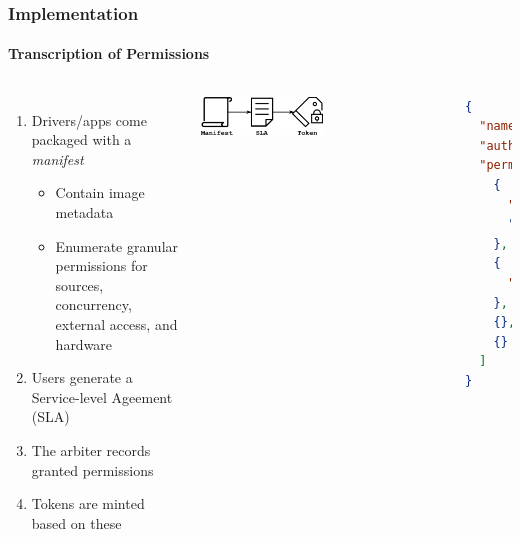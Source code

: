 \documentclass[aspectratio=169]{beamer}
\begin{document}
\begin{frame}[fragile]
	\frametitle{Implementation}
	\framesubtitle{Transcription of Permissions}
	\begin{columns}[c]
		\begin{enumerate}
			\item Drivers/apps come packaged with a \emph{manifest}
			\begin{itemize}
				\item Contain image metadata
				\item Enumerate granular permissions for sources, concurrency, external access, and hardware
			\end{itemize}
			\item Users generate a Service-level Ageement (SLA)
			\item The arbiter records granted permissions
			\item Tokens are minted based on these
		\end{enumerate}
		\centering
		\vspace{2em}
		\includegraphics[width=0.5\textwidth]{transcription}
		\centering
		\begin{lstlisting}[language=json]
{
  "name": "app",
  "author": "amar",
  "permissions": [
    {
      "source": "twitter"
      "required": true
    },
    {
      "source": "gps"
    },
    {},
    {}
  ]
}
		\end{lstlisting}
	\end{columns}
\end{frame}
\end{document}
